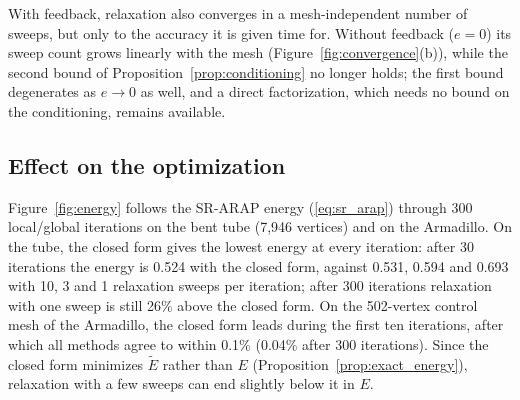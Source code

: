 \documentclass{birkjour}
\theoremstyle{remark}
\numberwithin{equation}{section}
\begin{document}
With feedback, relaxation also converges in a mesh-independent number of sweeps, but only to the accuracy it is given time for. Without feedback ($e = 0$) its sweep count grows linearly with the mesh (Figure~\ref{fig:convergence}(b)), while the second bound of Proposition~\ref{prop:conditioning} no longer holds; the first bound degenerates as $e \to 0$ as well, and a direct factorization, which needs no bound on the conditioning, remains available.

\subsection{Effect on the optimization}

Figure~\ref{fig:energy} follows the SR-ARAP energy (\ref{eq:sr_arap}) through 300 local/global iterations on the bent tube (7{,}946 vertices) and on the Armadillo. On the tube, the closed form gives the lowest energy at every iteration: after 30 iterations the energy is 0.524 with the closed form, against 0.531, 0.594 and 0.693 with 10, 3 and 1 relaxation sweeps per iteration; after 300 iterations relaxation with one sweep is still 26\% above the closed form. On the 502-vertex control mesh of the Armadillo, the closed form leads during the first ten iterations, after which all methods agree to within 0.1\% (0.04\% after 300 iterations). Since the closed form minimizes $\tilde E$ rather than $E$ (Proposition~\ref{prop:exact_energy}), relaxation with a few sweeps can end slightly below it in $E$.
\end{document}
